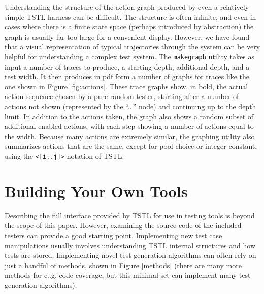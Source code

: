 Understanding the structure of the action graph produced by even a relatively simple TSTL harness can be difficult.  The structure is often infinite, and even in cases where there is a finite state space (perhaps introduced by abstraction) the graph is usually far too large for a convenient display.  However, we have found that a visual representation of typical trajectories through the system can be very helpful for understanding a complex test system.  The {\tt makegraph} utility takes as input a number of traces to produce, a starting depth, additional depth, and a test width.  It then produces in pdf form a number of graphs for traces like the one shown in Figure \ref{fig:actions}.  These trace graphs show, in bold, the actual action sequence chosen by a pure random tester, starting after a number of actions not shown (represented by the ``...'' node) and continuing up to the depth limit.  In addition to the actions taken, the graph also shows a random subset of additional enabled actions, with each step showing a number of actions equal to the width.  Because many actions are extremely similar, the graphing utility also summarizes actions that are the same, except for pool choice or integer constant, using the {\tt <[i..j]>} notation of TSTL.

\section{Building Your Own Tools}

Describing the full interface provided by TSTL for use in testing tools is beyond the scope of this paper.  However, examining the source code of the included testers can provide a good starting point.  Implementing new test case manipulations usually involves understanding TSTL internal structures and how tests are stored.  Implementing novel test generation algorithms can often rely on just a handful of methods, shown in Figure \ref{methods} (there are many more methods for e..g, code coverage, but this minimal set can implement many test generation algorithms).


